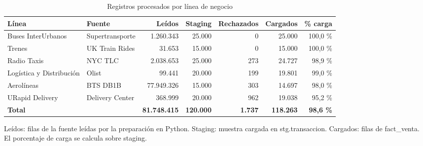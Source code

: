 \begin{table}[!htbp]
  \centering
  \caption{Registros procesados por línea de negocio}
  \label{tab:est_lineas}
  \small
  \begin{tabularx}{\linewidth}{@{}>{\raggedright\arraybackslash}p{2.6cm}>{\raggedright\arraybackslash}Xrrrrr@{}}
    \toprule
    \textbf{Línea} & \textbf{Fuente} & \textbf{Leídos} & \textbf{Staging} & \textbf{Rechazados} & \textbf{Cargados} & \textbf{\% carga} \\
    \midrule
    Buses InterUrbanos & Supertransporte & 1.260.343 & 25.000 & 0 & 25.000 & 100,0 \% \\
    Trenes & UK Train Rides & 31.653 & 15.000 & 0 & 15.000 & 100,0 \% \\
    Radio Taxis & NYC TLC & 2.038.653 & 25.000 & 273 & 24.727 & 98,9 \% \\
    Logística y Distribución & Olist & 99.441 & 20.000 & 199 & 19.801 & 99,0 \% \\
    Aerolíneas & BTS DB1B & 77.949.326 & 15.000 & 303 & 14.697 & 98,0 \% \\
    URapid Delivery & Delivery Center & 368.999 & 20.000 & 962 & 19.038 & 95,2 \% \\
    \midrule
    \textbf{Total} &  & \textbf{81.748.415} & \textbf{120.000} & \textbf{1.737} & \textbf{118.263} & \textbf{98,6 \%} \\
    \bottomrule
  \end{tabularx}
  \par\smallskip\footnotesize Leídos: filas de la fuente leídas por la preparación en Python. Staging: muestra cargada en stg.transaccion. Cargados: filas de fact\_venta. El porcentaje de carga se calcula sobre staging.
\end{table}

